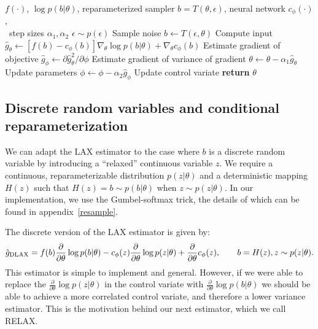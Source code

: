 \documentclass{article}
\newcommand{\PT}{\frac{\partial}{\partial \theta}}
\newcommand{\LAX}{{\textnormal{LAX}}}
\newcommand{\DLAX}{{\textnormal{DLAX}}}
\begin{document}
\begin{algorithm}[h]
\begin{algorithmic}
\Require $f(\cdot)$, $\log p(b|\theta)$, reparameterized sampler $b = T(\theta, \epsilon)$, neural network $c_\phi(\cdot)$, \\ \qquad \quad~step sizes $\alpha_1, \alpha_2$ 
	\State $\epsilon \sim p(\epsilon)$ \Comment Sample noise
	\State $b \leftarrow T(\epsilon, \theta)$ \Comment Compute input
	\State  $\hat g_\theta \leftarrow \left[f(b) - c_{\phi}(b) \right] \nabla_\theta \log p(b|\theta) + \nabla_\theta c_\phi(b)$ \Comment Estimate gradient of objective
	\State  $\hat g_\phi \leftarrow \partial \hat g_\theta^2 / \partial \phi$ \Comment Estimate gradient of variance of gradient
	\State $\theta \leftarrow \theta - \alpha_1 \hat{g}_\theta$ \Comment Update parameters
	\State $\phi \leftarrow \phi - \alpha_2 \hat{g}_\phi$ \Comment Update control variate
\EndWhile
\State \textbf{return} $\theta$ 
\end{algorithmic}
\caption{\LAX{}: Optimizing parameters and a gradient control variate simultaneously.}
\label{lax}
\end{algorithm}

\subsection{Discrete random variables and conditional reparameterization}
We can adapt the \LAX{} estimator to the case where $b$ is a discrete random variable by introducing a ``relaxed'' continuous variable $z$.
We require a continuous, reparameterizable distribution $p(z|\theta)$ and a deterministic mapping $H(z)$ such that $H(z) = b \sim p(b|\theta)$ when $z \sim p(z|\theta)$.
In our implementation, we use the Gumbel-softmax trick, the details of which can be found in appendix~\ref{resample}.

The discrete version of the \LAX{} estimator is given by:
%
\begin{align}
\label{eq:discrete lax}
\hat g_\DLAX = f(b) \PT \log p(b|\theta) - c_\phi(z) \PT \log p(z|\theta) + \PT c_\phi(z), \qquad b = H(z), z \sim p(z|\theta).
\end{align}
%
This estimator is simple to implement and general.
However, if we were able to replace the $\PT \log p(z|\theta)$ in the control variate with $\PT \log p(b|\theta)$ we should be able to achieve a more correlated control variate, and therefore a lower variance estimator. This is the motivation behind our next estimator, which we call RELAX.
\end{document}
